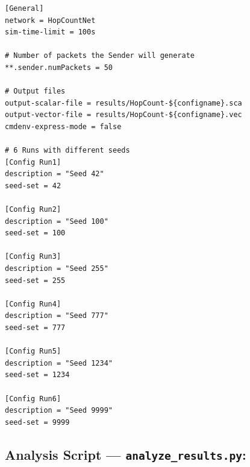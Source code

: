 \documentclass[12pt,a4paper]{article}
\begin{document}
\begin{lstlisting}[style=inistyle, caption={omnetpp.ini -- Six runs with different random seeds}]
[General]
network = HopCountNet
sim-time-limit = 100s

# Number of packets the Sender will generate
**.sender.numPackets = 50

# Output files
output-scalar-file = results/HopCount-${configname}.sca
output-vector-file = results/HopCount-${configname}.vec
cmdenv-express-mode = false

# 6 Runs with different seeds
[Config Run1]
description = "Seed 42"
seed-set = 42

[Config Run2]
description = "Seed 100"
seed-set = 100

[Config Run3]
description = "Seed 255"
seed-set = 255

[Config Run4]
description = "Seed 777"
seed-set = 777

[Config Run5]
description = "Seed 1234"
seed-set = 1234

[Config Run6]
description = "Seed 9999"
seed-set = 9999
\end{lstlisting}

\subsection{Analysis Script --- \texttt{analyze\_results.py}: }
\end{document}
